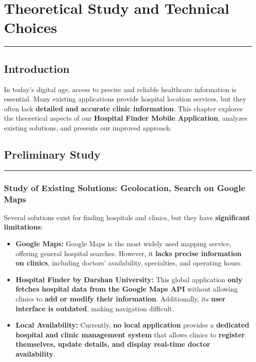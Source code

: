 \documentclass[12pt]{report}
\begin{document}
\newpage

\chapter{\textbf{Theoretical Study and Technical Choices}}
\rule{\linewidth}{1.5pt}

\section{\textbf{Introduction}}

In today's digital age, access to precise and reliable healthcare information is essential. Many existing applications provide hospital location services, but they often lack \textbf{detailed and accurate clinic information}. 
This chapter explores the theoretical aspects of our \textbf{Hospital Finder Mobile Application}, analyzes existing solutions, and presents our improved approach.

\section{\textbf{Preliminary Study}}
\vspace{-0.5cm}
\rule{7.5cm}{1.5pt}
\vspace{-0.5cm}
\subsection{\textbf{Study of Existing Solutions: Geolocation, Search on Google Maps}}

Several solutions exist for finding hospitals and clinics, but they have \textbf{significant limitations}:

\begin{itemize}
	\item \textbf{Google Maps:}
	      Google Maps is the most widely used mapping service, offering general hospital searches. However, it \textbf{lacks precise information on clinics}, including doctors' availability, specialties, and operating hours.
	\item \textbf{Hospital Finder by Darshan University:}
	      This global application \textbf{only fetches hospital data from the Google Maps API} without allowing clinics to \textbf{add or modify their information}. Additionally, its \textbf{user interface is outdated}, making navigation difficult.
	\item \textbf{Local Availability:}
	      Currently, \textbf{no local application} provides a \textbf{dedicated hospital and clinic management system} that allows clinics to \textbf{register themselves, update details, and display real-time doctor availability}.
\end{itemize}
\end{document}
